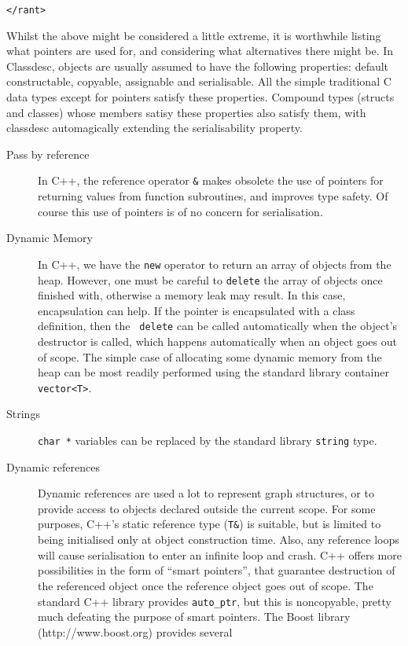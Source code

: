\noindent\verb+</rant>+

Whilst the above might be considered a little extreme, it is
worthwhile listing what pointers are used for, and considering what
alternatives there might be. In Classdesc, objects are usually assumed
to have the following properties: default constructable, copyable,
assignable and serialisable. All the simple traditional C data
types except for pointers satisfy these properties. Compound types
(structs and classes) whose members satisy these properties also
satisfy them, with classdesc automagically extending the
serialisability property.

\begin{description}
\item[Pass by reference] In C++, the reference operator \verb+&+ makes
  obsolete the use of pointers for returning values from function
  subroutines, and improves type safety. Of course this use of
  pointers is of no concern for serialisation.
\item[Dynamic Memory] In C++, we have the {\tt new} operator to return
  an array of objects from the heap. However, one must be careful to
  {\tt delete} the array of objects once finished with, otherwise a
  memory leak may result. In this case, encapsulation can help. If the
  pointer is encapsulated with a class definition, then the {\tt
    delete} can be called automatically when the object's destructor
  is called, which happens automatically when an object goes out of
  scope. The simple case of allocating some dynamic memory from the
  heap can be most readily performed using the standard library
  container \verb+vector<T>+.
\item[Strings] {\tt char *} variables can be replaced by the standard
  library {\tt string} type.
\item[Dynamic references] Dynamic references are used a lot to
  represent graph structures, or to provide access to objects declared
  outside the current scope. For some purposes, C++'s static reference
  type (\verb+T&+) is suitable, but is limited to being initialised
  only at object construction time. Also, any reference loops will
  cause serialisation to enter an infinite loop and crash. C++ offers
  more possibilities in the form of ``smart pointers'', that guarantee
  destruction of the referenced object once the reference object goes
  out of scope. The standard C++ library provides \verb+auto_ptr+, but
  this is noncopyable, pretty much defeating the purpose of smart
  pointers. The Boost library (http://www.boost.org) provides several

\end{description}
